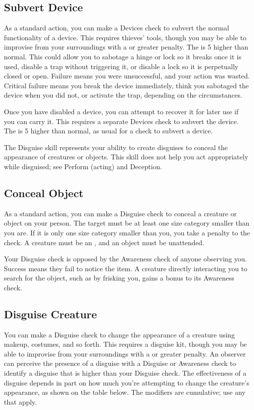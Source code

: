     \subsection{Subvert Device}
        As a standard action, you can make a Devices check to subvert the normal functionality of a device.
        This requires thieves' tools, though you may be able to improvise from your surroundings with a  or greater penalty.
        The  is 5 higher than normal. This could allow you to sabotage a hinge or lock so it breaks once it is used, disable a trap without triggering it, or disable a lock so it is perpetually closed or open. Failure means you were unsuccessful, and your action was wasted. Critical failure means you break the device immediately, think you sabotaged the device when you did not, or activate the trap, depending on the circumstances.

        Once you have disabled a device, you can attempt to recover it for later use if you can carry it. This requires a separate Devices check to subvert the device. The  is 5 higher than normal, as usual for a check to subvert a device.

\newpage
{}
        The Disguise skill represents your ability to create disguises to conceal the appearance of creatures or objects. This skill does not help you act appropriately while disguised; see Perform (acting) and Deception.

    \subsection{Conceal Object}
        As a standard action, you can make a Disguise check to conceal a creature or object on your person.
        The target must be at least one size category smaller than you are.
        If it is only one size category smaller than you, you take a  penalty to the check.
        A creature must be an , and an object must be unattended.

        Your Disguise check is opposed by the Awareness check of anyone observing you.
        Success means they fail to notice the item. A creature directly interacting you to search for the object, such as by frisking you, gains a  bonus to its Awareness check.

    \subsection{Disguise Creature}\label{Disguise Creature}
        You can make a Disguise check to change the appearance of a creature using makeup, costumes, and so forth.
        This requires a disguise kit, though you may be able to improvise from your surroundings with a  or greater penalty.
        An observer can perceive the presence of a disguise with a Disguise or Awareness check to identify a disguise that is higher than your Disguise check. The effectiveness of a disguise depends in part on how much you're attempting to change the creature's appearance, as shown on the table below. The modifiers are cumulative; use any that apply.


